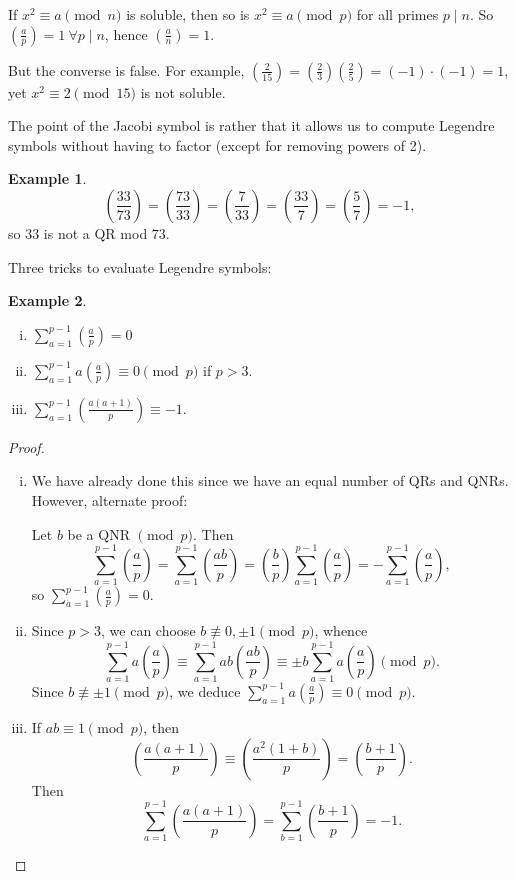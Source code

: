 \documentclass{article}
\theoremstyle{definition}
\newtheorem{example}{Example}[section]
\begin{document}
If $x^2 \equiv a\pmod{n}$ is soluble, then so is $x^2\equiv  a \pmod{p}$ for all primes $p \mid n$. So $\left(\frac{a}{p} \right) = 1 ~\forall p \mid n$, hence $\left(\frac{a}{n} \right) = 1$.

But the converse is false. For example, $\left(\frac{2}{15} \right) = \left(\frac{2}{3} \right) \left(\frac{2}{5} \right) = (-1)\cdot (-1) = 1$, yet $x^2 \equiv 2 \pmod{15}$ is not soluble.

The point of the Jacobi symbol is rather that it allows us to compute Legendre symbols without having to factor (except for removing powers of 2).
\begin{example}
    \[
    \left(\frac{33}{73} \right) = \left(\frac{73}{33} \right) = \left(\frac{7}{33} \right) = \left(\frac{33}{7} \right) = \left(\frac{5}{7} \right) = -1, 
    \]    
    so $33$ is not a QR mod $73$.
\end{example}

Three tricks to evaluate Legendre symbols:
\begin{example}
    \begin{enumerate}[(i)]
        \item $\sum_{a=1}^{p-1} \left(\frac{a}{p} \right) = 0$
        \item $\sum_{a=1}^{p-1} a \left(\frac{a}{p} \right) \equiv 0\pmod{p}$ if $p > 3$.
        \item $\sum_{a=1}^{p-1} \left(\frac{a(a+1)}{p} \right) \equiv -1$.
    \end{enumerate}
\end{example}
\begin{proof}
    \begin{enumerate}[(i)]
        \item We have already done this since we have an equal number of QRs and QNRs. However, alternate proof:
        \vspace{1mm}
        
        Let $b$ be a QNR $\pmod{p}$. Then 
        \[
        \sum_{a=1}^{p-1} \left(\frac{a}{p} \right) = \sum_{a=1}^{p-1} \left(\frac{ab}{p} \right) = \left(\frac{b}{p} \right) \sum_{a=1}^{p-1} \left(\frac{a}{p} \right) = - \sum_{a=1}^{p-1} \left(\frac{a}{p} \right), 
        \]
        so $\sum_{a=1}^{p-1} \left(\frac{a}{p} \right) = 0$.
        \item Since $p>3$, we can choose $b \not\equiv 0, \pm 1 \pmod{p}$, whence \[
        \sum_{a=1}^{p-1} a \left(\frac{a}{p} \right) \equiv  \sum_{a=1}^{p-1} ab \left(\frac{ab}{p} \right) \equiv  \pm b \sum_{a=1}^{p-1} a \left(\frac{a}{p} \right) \pmod{p}.
        \]
        Since $b \not\equiv \pm 1 \pmod{p}$, we deduce $\sum_{a=1}^{p-1} a \left(\frac{a}{p} \right) \equiv 0 \pmod{p}$.
        \item  If $ab \equiv 1\pmod{p}$, then \[
        \left(\frac{a(a+1)}{p} \right) \equiv \left(\frac{a^2(1+b)}{p} \right) = \left(\frac{b+1}{p} \right).  
        \]
        Then \[
        \sum_{a=1}^{p-1} \left(\frac{a(a+1)}{p} \right) = \sum_{b=1}^{p-1} \left(\frac{b+1}{p} \right) = -1.
        \]
    
        
    \end{enumerate}
\end{proof}
\end{document}

